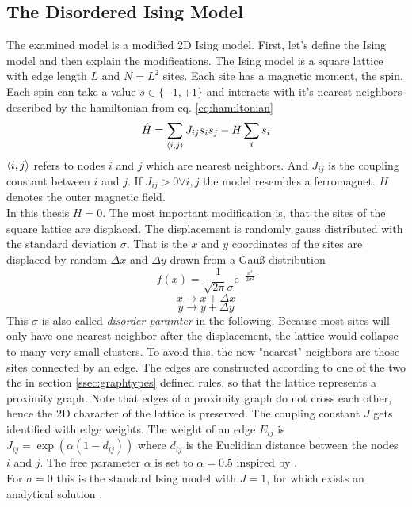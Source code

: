 \subsection{The Disordered Ising Model}
\label{ssec:isingmodel}
    The examined model is a modified 2D Ising model.
    First, let's define the Ising model and then explain the modifications.
    The Ising model is a square lattice with edge length \(L\) and
    \(N=L^2\) sites. Each site has a magnetic moment, the spin. Each
    spin can take a value \(s \in \{-1,+1\}\) and interacts with it's
    nearest neighbors described by the hamiltonian from eq. \eqref{eq:hamiltonian}
    \begin{equation}
        \hat{H} = \sum_{\left< i,j \right>}J_{ij}s_{i}s_{j} - H \sum_i s_i
        \label{eq:hamiltonian}
    \end{equation}
    \(\left< i,j \right>\) refers to nodes \(i\) and \(j\) which are nearest
    neighbors. And \(J_{ij}\) is the coupling constant between \(i\) and
    \(j\). If \(J_{ij} > 0 \forall i,j\) the model resembles a ferromagnet.
    \(H\) denotes the outer magnetic field.\\
    In this thesis \(H=0\). The most important modification is, that
    the sites of the square lattice are displaced. The
    displacement is randomly gauss distributed with the standard
    deviation \(\sigma\). That is the \(x\) and \(y\) coordinates of the
    sites are displaced by random \(\Delta x\) and \(\Delta y\) drawn
    from a Gauß distribution
    \[f(x)=\frac{1}{\sqrt{2\pi}\sigma}\mathrm{e}^{-\frac{x^2}{2\sigma^2}}\]
    \[x \to x + \Delta x\]
    \[y \to y + \Delta y\]
    This \(\sigma\) is also called \emph{disorder paramter} in the following.
    Because most sites will only have one nearest neighbor after the
    displacement, the lattice would collapse to many very small clusters.
    To avoid this, the new "nearest" neighbors are those sites connected
    by an edge. The edges are constructed according to
    one of the two the in section \ref{ssec:graphtypes} defined rules,
    so that the lattice represents a proximity graph. Note that edges
    of a proximity graph do not cross each other, hence the 2D character
    of the lattice is preserved. The coupling constant \(J\) gets
    identified with edge weights. The weight of an edge \(E_{ij}\) is
    \(J_{ij} = \exp (\alpha (1-d_{ij}))\) where \(d_{ij}\) is the Euclidian
    distance between the nodes \(i\) and \(j\). The free parameter
    \(\alpha\) is set to \(\alpha = 0.5\) inspired by \cite{Lima2000}.\\
    For \(\sigma = 0\) this is the standard Ising model with \(J = 1\),
    for which exists an analytical solution \cite{Onsager1944}.\\

